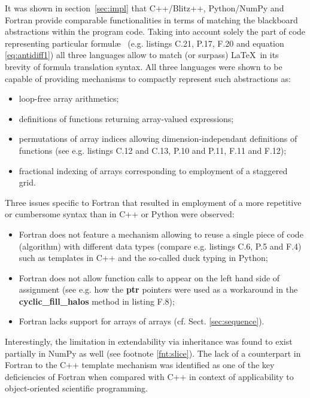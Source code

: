 \documentclass[final,5p,times,twocolumn]{elsarticle}
\newcommand{\prog}[1]{{\rm\bf#1}}
\begin{document}
  It was shown in section~\ref{sec:impl} that C++/Blitz++, Python/NumPy and Fortran
    provide comparable functionalities in terms of matching the blackboard abstractions
    within the program code.
  Taking into account solely the part of code representing particular formul\ae~
    (e.g. listings C.21, P.17, F.20 and equation \ref{eq:antidiff1}) all three
    languages allow to match (or surpass) \LaTeX~in its brevity of formula translation syntax.
  All three languages were shown to be capable of providing mechanisms to compactly represent such abstractions as:
  \begin{itemize}
    \item{loop-free array arithmetics;}
    \item{definitions of functions returning array-valued expressions;}
    \item{permutations of array indices allowing dimension-independant definitions
      of functions (see e.g. listings C.12 and C.13, P.10 and P.11, F.11 and F.12);}
    \item{fractional indexing of arrays corresponding to employment of a staggered grid.}
  \end{itemize}
  Three issues specific to Fortran that 
    resulted in employment of a more repetitive or cumbersome syntax than in C++ or Python
    were observed:
  \begin{itemize}
    \item{Fortran does not feature a mechanism allowing to reuse a single piece of code (algorithm)
      with different data types (compare e.g. listings C.6, P.5 and F.4) such as
      templates in C++ and the so-called duck typing in Python;}
    \item{Fortran does not allow function calls to appear on the left hand side
      of assignment (see e.g. how the \prog{ptr} pointers were used as a workaround in the \prog{cyclic\_fill\_halos}
      method in listing F.8);}
    \item{Fortran lacks support for arrays of arrays (cf. Sect. \ref{sec:sequence}).}
  \end{itemize}
  Interestingly, the limitation in extendability via inheritance was found to
    exist partially in NumPy as well (see footnote \ref{fnt:slice}).
  The lack of a counterpart in Fortran to the C++ template mechanism was identified
    \citep{Cary_et_al_1997}
    as one of the key deficiencies of Fortran when compared with C++ in context 
    of applicability to object-oriented scientific programming.
\end{document}
